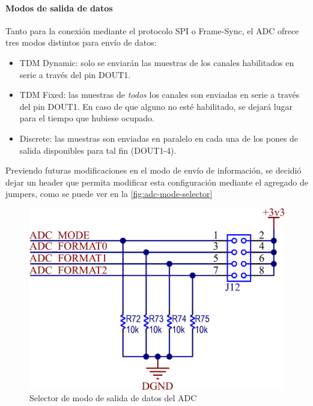 \documentclass[titlepage, 12pt]{article}
\begin{document}
\paragraph{Modos de salida de datos}
Tanto para la conexión mediante el protocolo SPI o Frame-Sync, el ADC ofrece tres modos distintos para envío de datos:
    \begin{itemize}
        \item TDM Dynamic: solo se enviarán las muestras de los canales habilitados en serie a través del pin DOUT1.
        \item TDM Fixed: las muestras de \emph{todos} los canales son enviadas en serie a través del pin DOUT1. En caso de que alguno no esté habilitado, se dejará lugar para el tiempo que hubiese ocupado.
        \item Discrete:  las muestras son enviadas en paralelo en cada una de los pones de salida disponibles para tal fin (DOUT1-4).
    \end{itemize}

Previendo futuras modificaciones en el modo de envío de información, se decidió dejar un header que permita modificar esta configuración mediante el agregado de jumpers, como se puede ver en la \autoref{fig:adc-mode-selector}

    \begin{figure}[!htbp]
        \centering
        \includegraphics[scale=1.5]{images/adc-mode-selector.png}
        \caption{Selector de modo de salida de datos del ADC}
        \label{fig:adc-mode-selector}
    \end{figure}
\end{document}
